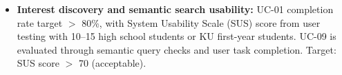 \begin{itemize}[leftmargin=80pt]
    \item \textbf{Interest discovery and semantic search usability:} UC-01 completion rate target $>$ 80\%, with System Usability Scale (SUS) score from user testing with 10--15 high school students or KU first-year students. UC-09 is evaluated through semantic query checks and user task completion. Target: SUS score $>$ 70 (acceptable).
\end{itemize}
